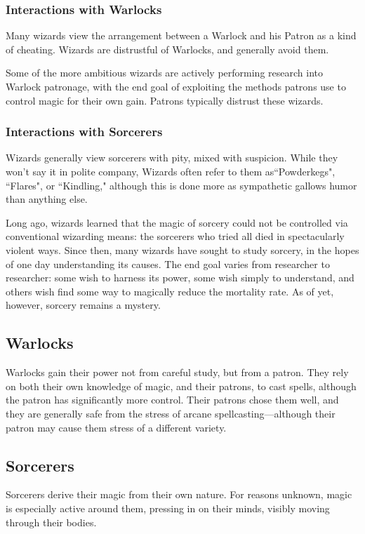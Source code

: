 \begin{multicols}{2}
\subsubsection{Interactions with Warlocks}
Many wizards view the arrangement between a Warlock and his Patron as a kind of cheating.
Wizards are distrustful of Warlocks, and generally avoid them.

Some of the more ambitious wizards are actively performing research into Warlock patronage, with the end goal of exploiting the methods patrons use to control magic for their own gain.
Patrons typically distrust these wizards.

\subsubsection{Interactions with Sorcerers}
Wizards generally view sorcerers with pity, mixed with suspicion.
While they won't say it in polite company, Wizards often refer to them as``Powderkegs", ``Flares", or ``Kindling," although this is done more as sympathetic gallows humor than anything else.

Long ago, wizards learned that the magic of sorcery could not be controlled via conventional wizarding means: the sorcerers who tried all died in spectacularly violent ways.
Since then, many wizards have sought to study sorcery, in the hopes of one day understanding its causes.
The end goal varies from researcher to researcher: some wish to harness its power, some wish simply to understand, and others wish find some way to magically reduce the mortality rate.
As of yet, however, sorcery remains a mystery.

\subsection{Warlocks}

Warlocks gain their power not from careful study, but from a patron.
They rely on both their own knowledge of magic, and their patrons, to cast spells, although the patron has significantly more control.
Their patrons chose them well, and they are generally safe from the stress of arcane spellcasting---although their patron may cause them stress of a different variety.

\subsection{Sorcerers}
Sorcerers derive their magic from their own nature.
For reasons unknown, magic is especially active around them, pressing in on their minds, visibly moving through their bodies.


\end{multicols}
